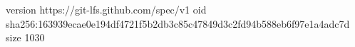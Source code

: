 version https://git-lfs.github.com/spec/v1
oid sha256:163939ecae0e194df4721f5b2db3c85c47849d3c2fd94b588eb6f97e1a4adc7d
size 1030
